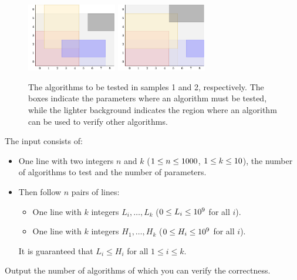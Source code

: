 \begin{figure}[!h]
\centering

\hfill%
\includegraphics[width=0.35\textwidth]{sample1}%
\hfill%
\includegraphics[width=0.35\textwidth]{sample2}%
\hfill%
\hfill%

\caption{
    \centering
    The algorithms to be tested in samples 1 and 2, respectively.
    The boxes indicate the parameters where an algorithm must be tested,
    while the lighter background indicates the region
    where an algorithm can be used to verify other algorithms.
}
\label{fig:debugging}
\end{figure}

\vspace{-1em}

\begin{Input}
  The input consists of:
  \begin{itemize}
    \item One line with two integers $n$ and $k$ ($1\leq n\leq 1000$, $1\leq k\leq 10$),
          the number of algorithms to test and the number of parameters.
    \item Then follow $n$ pairs of lines:
          \begin{itemize}
            \item One line with $k$ integers
                  $L_i, \dots, L_k$ ($0\leq L_i \leq 10^9$ for all $i$).
            \item One line with $k$ integers
                  $H_1, \dots, H_k$ ($0\leq H_i \leq 10^9$ for all $i$).
            \end{itemize}
          It is guaranteed that $L_i \leq H_i$ for all $1 \leq i\leq k$.
  \end{itemize}
\end{Input}

\begin{Output}
    Output the number of algorithms of which you can verify the correctness.
\end{Output}
